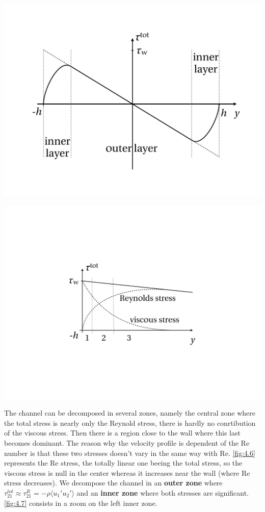 		\begin{center}
		\begin{minipage}{0.49\textwidth}
		\includegraphics[scale=0.25]{ch4/6}
		\label{fig:4.6}
		\end{minipage}
		\begin{minipage}{0.49\textwidth}
		\includegraphics[scale=0.41]{ch4/7}
		\label{fig:4.7}
		\end{minipage}
		\end{center}
		
		The channel can be decomposed in several zones, namely the central zone where the total stress is nearly only the Reynold stress, there is hardly no conrtibution of the viscous stress. Then there is a region close to the wall where this last becomes dominant. The reason why the velocity profile is dependent of the Re number is that these two stresses doesn't vary in the same way with Re. \autoref{fig:4.6} represents the Re stress, the totally linear one beeing the total stress, so the viscous stress is null in the center whereas it increases near the wall (where Re stress decreases). We decompose the channel in an \textbf{outer zone }where $\tau _{21}^{tot} \approx \tau _{21} ^R = -\rho \langle u_1'u_2' \rangle$ and an \textbf{inner zone} where both stresses are significant. \autoref{fig:4.7} consists in a zoom on the left inner zone. \\
		
